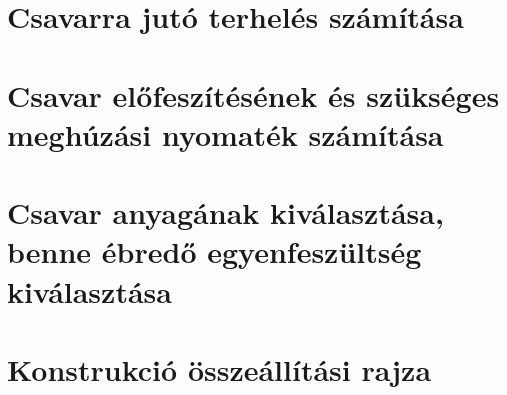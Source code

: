 \documentclass[10pt, a4paper]{article}
\begin{document}
	\section{Csavarra jutó terhelés számítása}
	\section{Csavar előfeszítésének és szükséges meghúzási nyomaték számítása}
	\section{Csavar anyagának kiválasztása, benne ébredő egyenfeszültség kiválasztása}
	\section{Konstrukció összeállítási rajza}
\end{document}
